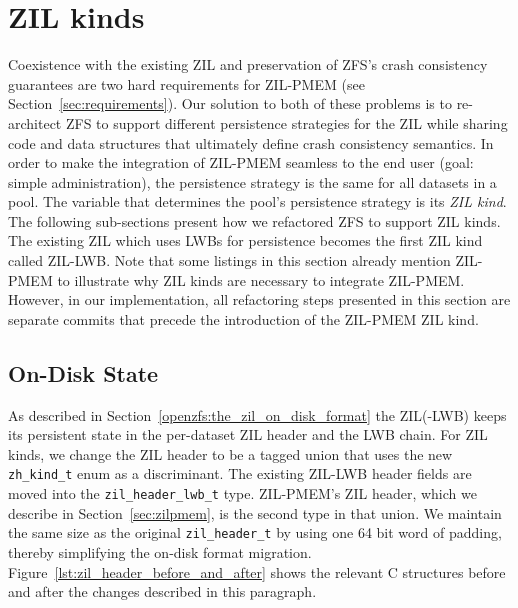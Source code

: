 \documentclass[12pt,a4paper,twoside]{book}
\begin{document}
\section{ZIL kinds}
Coexistence with the existing ZIL and preservation of ZFS's crash consistency guarantees are two hard requirements for ZIL-PMEM (see Section~\ref{sec:requirements}).
Our solution to both of these problems is to re-architect ZFS to support different persistence strategies for the ZIL while sharing code and data structures that ultimately define crash consistency semantics.
In order to make the integration of ZIL-PMEM seamless to the end user (goal: simple administration), the persistence strategy is the same for all datasets in a pool.
The variable that determines the pool's persistence strategy is its \textit{ZIL kind}.
The following sub-sections present how we refactored ZFS to support ZIL kinds.
The existing ZIL which uses LWBs for persistence becomes the first ZIL kind called ZIL-LWB.
Note that some listings in this section already mention ZIL-PMEM to illustrate why ZIL kinds are necessary to integrate ZIL-PMEM.
However, in our implementation, all refactoring steps presented in this section are separate commits that precede the introduction of the ZIL-PMEM ZIL kind.

\subsection{On-Disk State}\label{sec:di:zil_header}
As described in Section~\ref{openzfs:the_zil_on_disk_format} the ZIL(-LWB) keeps its persistent state in the per-dataset ZIL header and the LWB chain.
For ZIL kinds, we change the ZIL header to be a tagged union that uses the new \lstinline{zh_kind_t} enum as a discriminant.
The existing ZIL-LWB header fields are moved into the \lstinline{zil_header_lwb_t} type.
ZIL-PMEM's ZIL header, which we describe in Section~\ref{sec:zilpmem}, is the second type in that union.
We maintain the same size as the original \lstinline{zil_header_t} by using one 64 bit word of padding, thereby simplifying the on-disk format migration.
Figure~\ref{lst:zil_header_before_and_after} shows the relevant C structures before and after the changes described in this paragraph.
\end{document}
